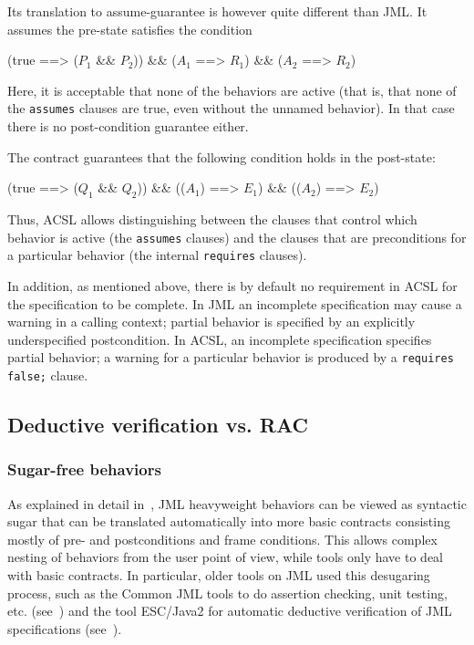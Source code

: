 \noindent
Its translation to assume-guarantee is however quite different than JML.
It assumes the pre-state satisfies the condition

\begin{listing-nonumber}
  (true ==> ($P_1$ && $P_2$)) && ($A_1$ ==> $R_1$) && ($A_2$ ==> $R_2$)
\end{listing-nonumber}
Here, it is acceptable that none of the behaviors are active (that is, that none of the \lstinline|assumes| clauses are true, even without the unnamed behavior). In that case there is no post-condition guarantee either.

The contract guarantees that the following condition holds in the post-state:

\begin{listing-nonumber}
(true ==> ($Q_1$ && $Q_2$)) && (\old($A_1$) ==> $E_1$) && (\old($A_2$) ==> $E_2$)
\end{listing-nonumber}

Thus, ACSL allows distinguishing between the clauses that control
which behavior is active (the \lstinline|assumes| clauses) and the
clauses that are preconditions for a particular behavior (the internal
\lstinline|requires| clauses). 

In addition, as mentioned above, there is
by default no requirement in ACSL for the specification to be complete. In JML an incomplete specification may cause a warning in a calling context; partial behavior is specified by an explicitly underspecified postcondition. In ACSL, an incomplete specification specifies partial behavior; a warning for a particular behavior is produced by a \lstinline|requires false;| clause.

\subsection{Deductive verification vs. RAC}

\subsubsection*{Sugar-free behaviors}

As explained in detail in~\cite{raghavan00desugaring}, JML
heavyweight behaviors can be viewed as syntactic sugar that can be translated automatically into more basic
contracts consisting mostly of pre- and postconditions and frame
conditions.  This allows complex nesting of behaviors from the user
point of view, while tools only have to deal with basic contracts. In
particular, older tools on JML used this desugaring process, such as
the Common JML tools to do assertion checking, unit testing,
etc. (see~\cite{leavens00jml}) and the tool ESC/Java2 for
automatic deductive verification of JML specifications
(see~\cite{Kiniry-Cok05}).

